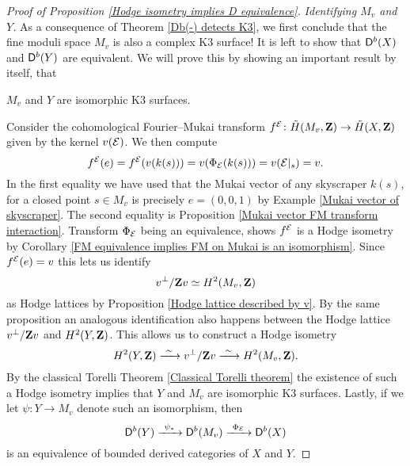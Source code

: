 \begin{proof}[Proof of Proposition \ref{Hodge isometry implies D equivalence}]
    \vspace{0.3 cm}
    \noindent
    \textsl{Identifying $M_v$ and $Y$.}
    As a consequence of Theorem \ref{Db(-) detects K3}, we first conclude that the fine moduli space $M_v$ is also a complex K3 surface!
    It is left to show that $\mathsf{D}^b(X)$ and $\mathsf{D}^b(Y)$ are equivalent. We will prove this by showing an important result by itself, that
    \begin{center}
        $M_v$ and $Y$ are isomorphic K3 surfaces.
    \end{center}
    Consider the cohomological Fourier--Mukai transform $f^{\mathcal E} \colon \,\tilde{\!{H}}(M_v, \mathbf Z) \to \,\tilde{\!{H}}(X, \mathbf Z)$ given by the kernel $v(\mathcal E)$. We then compute 
    \[
        f^{\mathcal E}(e) = f^{\mathcal E}(v(k(s))) = v(\Phi_{\mathcal E}(k(s))) = v(\mathcal E|_s) = v.
    \]
    In the first equality we have used that the Mukai vector of any skyscraper $k(s)$, for a closed point $s \in M_v$ is precisely $e = (0,0,1)$ by Example \ref{Mukai vector of skyscraper}. The second equality is Proposition \ref{Mukai vector FM transform interaction}. 
    Transform $\Phi_{\mathcal E}$ being an equivalence, shows $f^{\mathcal E}$ is a Hodge isometry by Corollary \ref{FM equivalence implies FM on Mukai is an isomorphism}. Since $f^{\mathcal E}(e) = v$ this lets us identify 
    \[
        {v}^\perp / \mathbf Z{v} \simeq H^{2}(M_v, \mathbf Z)
    \]
    as Hodge lattices by Proposition \ref{Hodge lattice described by v}. By the same proposition an analogous identification also happens between the Hodge lattice ${v}^\perp / \mathbf Z{v}$ and $H^{2}(Y, \mathbf Z)$. This allows us to construct a Hodge isometry
    \[
        H^{2}(Y, \mathbf Z) \xrightarrow{\ \sim \ } {v}^\perp / \mathbf Z{v} \xrightarrow{\ \sim \ } H^{2}(M_v, \mathbf Z).
    \]
    By the classical Torelli Theorem \ref{Classical Torelli theorem} the existence of such a Hodge isometry implies that $Y$ and $M_v$ are isomorphic K3 surfaces. Lastly, if we let $\psi \colon Y \to M_v$ denote such an isomorphism, then 
    \[
        \mathsf{D}^b(Y) \xrightarrow{\ \psi_* \ } \mathsf{D}^b(M_v) \xrightarrow{\ \Phi_{\mathcal E} \ } \mathsf{D}^b(X) 
    \]
    is an equivalence of bounded derived categories of $X$ and $Y$.
\end{proof}

